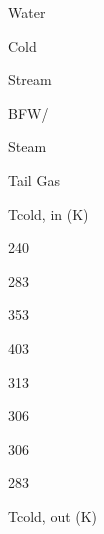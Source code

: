 \documentclass[a4paper,portrait,12pt]{article}
\begin{document}
\begin{flushleft}
Water
\end{flushleft}





\begin{flushleft}
Cold
\end{flushleft}


\begin{flushleft}
Stream
\end{flushleft}





\begin{flushleft}
BFW/
\end{flushleft}


\begin{flushleft}
Steam
\end{flushleft}





\begin{flushleft}
Tail Gas
\end{flushleft}





\begin{flushleft}
Tcold, in (K)
\end{flushleft}





240





283





353





403





313





306





306





283





\begin{flushleft}
Tcold, out (K)
\end{flushleft}
\end{document}
